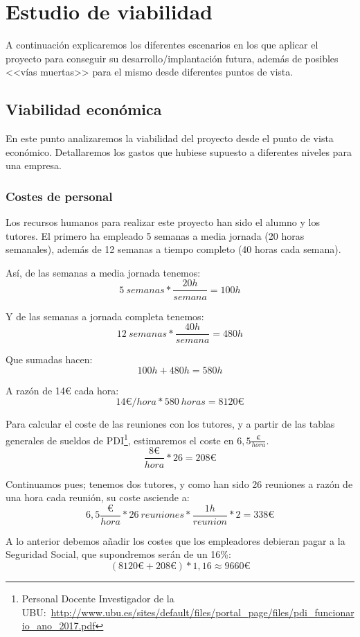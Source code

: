 \section{Estudio de viabilidad}
A continuación explicaremos los diferentes escenarios en los que aplicar el proyecto para conseguir su desarrollo/implantación futura, además de posibles <<vías muertas>> para el mismo desde diferentes puntos de vista.

\subsection{Viabilidad económica}
En este punto analizaremos la viabilidad del proyecto desde el punto de vista económico. Detallaremos los gastos que hubiese supuesto a diferentes niveles para una empresa.

\subsubsection{Costes de personal}
Los recursos humanos para realizar este proyecto han sido el alumno y los tutores. El primero ha empleado 5 semanas a media jornada (20 horas semanales), además de 12 semanas a tiempo completo (40 horas cada semana).

\noindent Así, de las semanas a media jornada tenemos:
\[ 5 \ semanas * \frac{20h}{semana} = 100h \]

\noindent Y de las semanas a jornada completa tenemos:
\[ 12 \ semanas * \frac{40h}{semana} = 480h \]

\noindent Que sumadas hacen:
\[ 100h + 480h = 580h\]

\noindent A razón de 14\euro{} cada hora:
\[ 14 \euro /hora * 580 \ horas = 8120\euro \]

Para calcular el coste de las reuniones con los tutores, y a partir de las tablas generales de sueldos de PDI\footnote{Personal Docente Investigador de la UBU:~\url{http://www.ubu.es/sites/default/files/portal_page/files/pdi_funcionario_ano_2017.pdf}}, estimaremos el coste en $ 6,5\frac{\euro}{hora} $.
\[ \frac{8\euro}{hora} * 26 = 208\euro \]

Continuamos pues; tenemos dos tutores, y como han sido 26 reuniones a razón de una hora cada reunión, su coste asciende a:
\[ 6,5\frac{\euro}{hora} * 26 \ reuniones * \frac{1h}{reunion} * 2 = 338\euro \]

A lo anterior debemos añadir los costes que los empleadores debieran pagar a la Seguridad Social, que supondremos serán de un 16\%:
\[ (8120\euro + 208\euro) * 1,16 \approx 9660\euro \]

